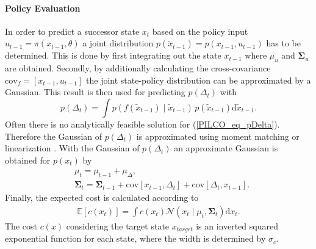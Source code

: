 \documentclass[letterpaper, 10 pt, conference]{ieeeconf}  %
\begin{document}
\paragraph{Policy Evaluation}
In order to predict a successor state $x_t$ based on the policy input $u_{t-1} = \pi\left(x_{t-1},\theta\right)$ a joint distribution $p\left(\tilde{x}_{t-1}\right) = p\left(x_{t-1},u_{t-1}\right)$ has to be determined. This is done by first integrating out the state $x_{t-1}$ where $\mu_u$ and $\mathbf{\Sigma}_u$ are obtained. Secondly, by additionally calculating the cross-covariance $\text{cov}_f = \left[{x}_{t-1},u_{t-1}\right]$ the joint state-policy distribution can be approximated by a Gaussian. This result is then used for predicting $p\left(\Delta_t\right)$ with
\begin{equation}\label{PILCO_eq_pDelta}
p\left(\Delta_t\right) = \int p\left(f(\tilde{x}_{t-1})\mid\tilde{x}_{t-1}\right)\, p\left(\tilde{x}_{t-1}\right) \text{d}\tilde{x}_{t-1}.
\end{equation}
Often there is no analytically feasible solution for (\ref{PILCO_eq_pDelta}). Therefore the Gaussian of $p\left(\Delta_t\right)$ is approximated using moment matching or linearization \cite{GP_deisenroth}. With the Gaussian of $p\left(\Delta_t\right)$ an approximate Gaussian is obtained for $p\left(x_t\right)$ by
\begin{align}
&\mu_t = \mu_{t-1}+\mu_\Delta, \\
&\mathbf{\Sigma}_t = \mathbf{\Sigma}_{t-1} +\text{cov}\left[x_{t-1},\Delta_{t}\right]+\text{cov}\left[\Delta_t,x_{t-1}\right].
\end{align}
Finally, the expected cost is calculated according to 
\begin{align}
\mathbb{E}\left[c\left(x_t\right)\right] = \int c\left(x_t\right) \mathcal{N}\left(x_t\mid\mu_t,\mathbf{\Sigma}_t\right) \text{d}x_t.
\end{align}
The cost $c(x)$ considering the target state $x_{target}$ is an inverted squared exponential function for each state,
where the width is determined by $\sigma_c$.
\end{document}
